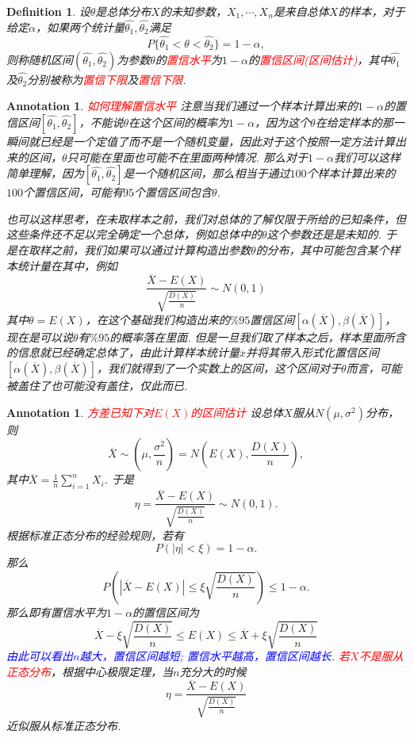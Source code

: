 \documentclass{article}
\newtheorem{definition}[theorem]{Definition}
\newtheorem{annotation}[theorem]{Annotation}
\newcommand{\redt}[1]{\textcolor{red}{#1}}
\newcommand{\bluet}[1]{\textcolor{blue}{#1}}
\begin{document}
\begin{definition}
\rm 设$\theta$是总体分布$X$的未知参数，$X_1,\cdots,X_n$是来自总体$X$的样本，对于给定$\alpha$，如果两个统计量$\widehat{\theta_1},\widehat{\theta_2}$满足
$$
P\{\widehat{\theta_1} < \theta < \widehat{\theta_2}\} = 1-\alpha,
$$
则称随机区间$(\widehat{\theta_1},\widehat{\theta_2})$为参数$\theta$的\redt{置信水平}为$1-\alpha$的\redt{置信区间(区间估计)}，其中$\widehat{\theta_1}$及$\widehat{\theta_2}$分别被称为\redt{置信下限}及\redt{置信下限}. 
\end{definition}

\begin{annotation}
\rm \redt{如何理解置信水平} 注意当我们通过一个样本计算出来的$1-\alpha$的置信区间$[\widehat{\theta_1},\widehat{\theta_2}]$，不能说$\theta$在这个区间的概率为$1-\alpha$，因为这个$\theta$在给定样本的那一瞬间就已经是一个定值了而不是一个随机变量，因此对于这个按照一定方法计算出来的区间，$\theta$只可能在里面也可能不在里面两种情况. 那么对于$1-\alpha$我们可以这样简单理解，因为$[\widehat{\theta_1},\widehat{\theta_2}]$是一个随机区间，那么相当于通过$100$个样本计算出来的$100$个置信区间，可能有$95$个置信区间包含$\theta$. 

也可以这样思考，在未取样本之前，我们对总体的了解仅限于所给的已知条件，但这些条件还不足以完全确定一个总体，例如总体中的$\theta$这个参数还是是未知的. 于是在取样之前，我们如果可以通过计算构造出参数$\theta$的分布，其中可能包含某个样本统计量在其中，例如
$$
\frac{\overline{X}-E(X)}{\sqrt{\frac{D(X)}{n}}} \sim N(0,1)
$$
其中$\theta = E(X)$，在这个基础我们构造出来的$\%95$置信区间$[\alpha(\overline{X}),\beta(\overline{X})]$，现在是可以说$\theta$有$\%95$的概率落在里面. 但是一旦我们取了样本之后，样本里面所含的信息就已经确定总体了，由此计算样本统计量$\overline{x}$并将其带入形式化置信区间$[\alpha(\overline{X}),\beta(\overline{X})]$，我们就得到了一个实数上的区间，这个区间对于$\theta$而言，可能被盖住了也可能没有盖住，仅此而已. 
\end{annotation}

\begin{annotation}
\rm \redt{方差已知下对$E(X)$的区间估计} 设总体$X$服从$N(\mu,\sigma^2)$分布，则
$$
\overline{X} \sim \left(\mu, \frac{\sigma^2}{n}\right) = N\left(E(X),\frac{D(X)}{n}\right),
$$
其中$\overline{X}= \frac{1}{n}\sum\limits_{i=1}^n X_i$. 于是
$$
\eta = \frac{\overline{X}-E(X)}{\sqrt{\frac{D(X)}{n}}} \sim N(0,1). 
$$
根据标准正态分布的经验规则，若有
$$
P\left(|\eta| < \xi\right) = 1-\alpha.   
$$
那么
$$
P\left( |\overline{X}-E(X)| \leq \xi \sqrt{\frac{D(X)}{n}}   \right) \leq 1-\alpha.
$$
那么即有置信水平为$1-\alpha$的置信区间为
$$
\overline{X} - \xi \sqrt{\frac{D(X)}{n}} \leq E(X) \leq  \overline{X} + \xi \sqrt{\frac{D(X)}{n}}
$$
\bluet{由此可以看出$n$越大，置信区间越短; 置信水平越高，置信区间越长}. \redt{若$X$不是服从正态分布}，根据中心极限定理，当$n$充分大的时候
$$
\eta = \frac{\overline{X}-E(X)}{\sqrt{\frac{D(X)}{n}}}
$$
近似服从标准正态分布. 
\end{annotation}
\end{document}
